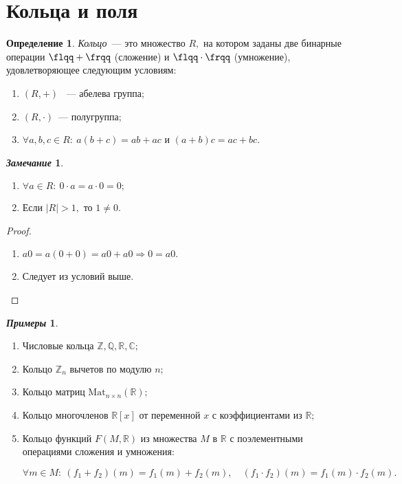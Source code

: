 \documentclass[a4paper, 14pt]{extarticle}
\newcommand{\n}{\par}
\newcommand{\integers}{\mathbb{Z}}
\newcommand{\rationals}{\mathbb{Q}}
\newcommand{\real}{\mathbb{R}}
\newcommand{\complex}{\mathbb{C}}
\newcommand{\suchthat}{{:}{ } \ }
\theoremstyle{definition}
\newtheorem*{exmpls}{\textit{Примеры}}
\newtheorem*{remark}{\textit{Замечание}}
\newtheorem{definition}{Определение}
\theoremstyle{plain}
\numberwithin{theorem}{section}
\numberwithin{definition}{section}
\numberwithin{statement}{section}
\numberwithin{lemma}{section}
\numberwithin{consequence}{section}
\begin{document}
	\section{Кольца и поля}
	\setcounter{definition}{0}
	\begin{definition}
		\textit{Кольцо}~--- это множество $R,$ на котором заданы две бинарные операции ${\flqq+\frqq}$ (сложение) и ${\flqq \cdot \frqq}$ (умножение), удовлетворяющее следующим условиям:
		\begin{enumerate}
			\setlength\itemsep{0.1em}
			\item $(R, +)$ ~--- абелева группа;
			\item $(R, \cdot)$~--- полугруппа;
			\item $\forall a, b, c \in R\suchthat a(b + c) = ab + ac$ и $(a + b)c = ac + bc.$
		\end{enumerate} 
	\end{definition}
	\begin{remark}
		\
		\begin{enumerate}
			\setlength\itemsep{0.1em}
			\item $\forall a \in R\suchthat 0 \cdot a = a \cdot 0 = 0;$
			\item Если $|R| > 1,$ то $1 \neq 0.$ 
		\end{enumerate}
	\end{remark}
	\begin{proof}
		\
		\begin{enumerate}
			\setlength\itemsep{0.1em}
			\item $a0 = a(0 + 0) = a0 + a0 \Longrightarrow 0 = a0.$
			\item Следует из условий выше. \qedhere
		\end{enumerate}
	\end{proof}
	\begin{exmpls}
		\
		\begin{enumerate}
			\setlength\itemsep{0.1em}
			\item Числовые кольца $\integers, \rationals, \real, \complex;$
			\item Кольцо $\integers_n$ вычетов по модулю $n;$
			\item Кольцо матриц $\mathrm{Mat}_{n \times n}(\real);$
			\item Кольцо многочленов $\real[x]$ от переменной $x$ с коэффициентами из $\real;$
			\item Кольцо функций $F(M, \real)$ из множества $M$ в $\real$ с поэлементными
			операциями сложения и умножения: \n
			$\forall m \in M\suchthat (f_1 + f_2)(m) = f_1(m) + f_2(m), \quad (f_1 \cdot f_2)(m) = f_1(m) \cdot f_2(m).$
		\end{enumerate}
	\end{exmpls}
\end{document}
